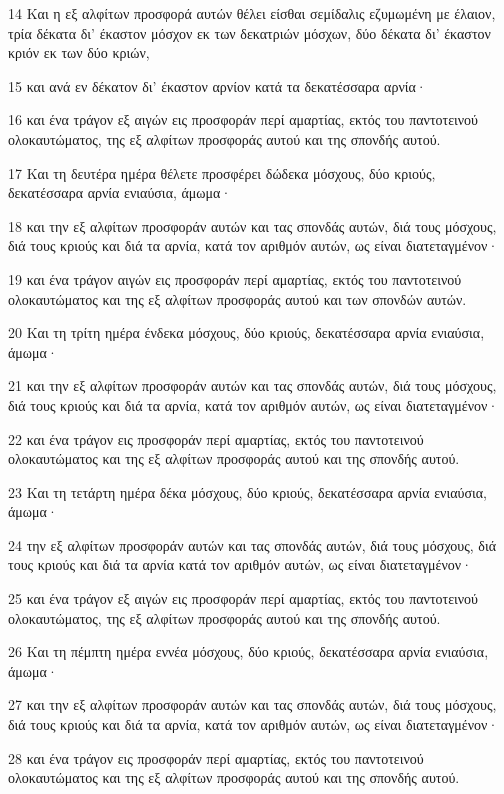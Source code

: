 \par 14 Και η εξ αλφίτων προσφορά αυτών θέλει είσθαι σεμίδαλις εζυμωμένη με έλαιον, τρία δέκατα δι' έκαστον μόσχον εκ των δεκατριών μόσχων, δύο δέκατα δι' έκαστον κριόν εκ των δύο κριών,
\par 15 και ανά εν δέκατον δι' έκαστον αρνίον κατά τα δεκατέσσαρα αρνία·
\par 16 και ένα τράγον εξ αιγών εις προσφοράν περί αμαρτίας, εκτός του παντοτεινού ολοκαυτώματος, της εξ αλφίτων προσφοράς αυτού και της σπονδής αυτού.
\par 17 Και τη δευτέρα ημέρα θέλετε προσφέρει δώδεκα μόσχους, δύο κριούς, δεκατέσσαρα αρνία ενιαύσια, άμωμα·
\par 18 και την εξ αλφίτων προσφοράν αυτών και τας σπονδάς αυτών, διά τους μόσχους, διά τους κριούς και διά τα αρνία, κατά τον αριθμόν αυτών, ως είναι διατεταγμένον·
\par 19 και ένα τράγον αιγών εις προσφοράν περί αμαρτίας, εκτός του παντοτεινού ολοκαυτώματος και της εξ αλφίτων προσφοράς αυτού και των σπονδών αυτών.
\par 20 Και τη τρίτη ημέρα ένδεκα μόσχους, δύο κριούς, δεκατέσσαρα αρνία ενιαύσια, άμωμα·
\par 21 και την εξ αλφίτων προσφοράν αυτών και τας σπονδάς αυτών, διά τους μόσχους, διά τους κριούς και διά τα αρνία, κατά τον αριθμόν αυτών, ως είναι διατεταγμένον·
\par 22 και ένα τράγον εις προσφοράν περί αμαρτίας, εκτός του παντοτεινού ολοκαυτώματος και της εξ αλφίτων προσφοράς αυτού και της σπονδής αυτού.
\par 23 Και τη τετάρτη ημέρα δέκα μόσχους, δύο κριούς, δεκατέσσαρα αρνία ενιαύσια, άμωμα·
\par 24 την εξ αλφίτων προσφοράν αυτών και τας σπονδάς αυτών, διά τους μόσχους, διά τους κριούς και διά τα αρνία κατά τον αριθμόν αυτών, ως είναι διατεταγμένον·
\par 25 και ένα τράγον εξ αιγών εις προσφοράν περί αμαρτίας, εκτός του παντοτεινού ολοκαυτώματος, της εξ αλφίτων προσφοράς αυτού και της σπονδής αυτού.
\par 26 Και τη πέμπτη ημέρα εννέα μόσχους, δύο κριούς, δεκατέσσαρα αρνία ενιαύσια, άμωμα·
\par 27 και την εξ αλφίτων προσφοράν αυτών και τας σπονδάς αυτών, διά τους μόσχους, διά τους κριούς και διά τα αρνία, κατά τον αριθμόν αυτών, ως είναι διατεταγμένον·
\par 28 και ένα τράγον εις προσφοράν περί αμαρτίας, εκτός του παντοτεινού ολοκαυτώματος και της εξ αλφίτων προσφοράς αυτού και της σπονδής αυτού.
